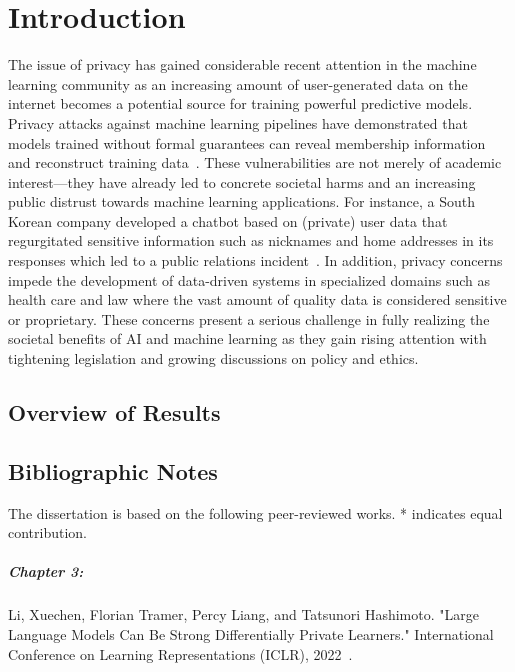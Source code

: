 \chapter{Introduction}

The issue of privacy has gained considerable recent attention in the machine learning community as an increasing amount of user-generated data on the internet becomes a potential source for training powerful predictive models.
Privacy attacks against machine learning pipelines have demonstrated that models trained without formal guarantees can reveal membership information and reconstruct training data~\cite{shokri2017membership,carlini2021extracting}.
These vulnerabilities are not merely of academic interest---they have already led to concrete societal harms and an increasing public distrust towards machine learning applications.
For instance, a South Korean company developed a chatbot based on (private) user data that regurgitated sensitive information such as nicknames and home addresses in its responses which led to a public relations incident~\cite{sk-chatbot}.
In addition, privacy concerns impede the development of data-driven systems in specialized domains such as health care and law where the vast amount of quality data is considered sensitive or proprietary.
These concerns present a serious challenge in fully realizing the societal benefits of AI and machine learning as they gain rising attention with tightening legislation and growing discussions on policy and ethics. 



\section{Overview of Results}

\newpage
\section*{Bibliographic Notes}

The dissertation is based on the following peer-reviewed works.
* indicates equal contribution.

\paragraph{Chapter 3:} 
Li, Xuechen, Florian Tramer, Percy Liang, and Tatsunori Hashimoto. "Large Language Models Can Be Strong Differentially Private Learners." International Conference on Learning Representations (ICLR), 2022~\cite{li2021large}.

